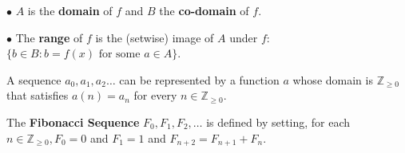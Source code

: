 \documentclass{article}
\begin{document}
\begin{description}
    \begin{description}
    	\item $\bullet$ $A$ is the \textbf{domain} of $f$ and $B$ the \textbf{co-domain} of $f$.
    	\item $\bullet$ The \textbf{range} of $f$ is the (setwise) image of $A$ under $f$: $\{b \in B:b = f(x) \text{ for some }a\in A\}$.    	
    \end{description}
    \item[Sequence (of infinite length)] A sequence $a_{0}, a_{1}, a_{2} \dots$ can be represented by a function $a$ whose domain is $\mathbb{Z}_{\geq 0}$ that satisfies $a(n)=a_{n}$ for every $n\in \mathbb{Z}_{\geq 0}$.
    \item[Fibonacci Sequence] The \textbf{Fibonacci Sequence} $F_{0}, F_{1}, F_{2}, \dots$ is defined by setting, for each $n \in \mathbb{Z}_{\geq 0}, F_{0}=0$ and $F_{1}=1$ and $F_{n+2}=F_{n+1}+F_{n}$.
    \item 
	    
\end{description}


\newpage
\end{document}
